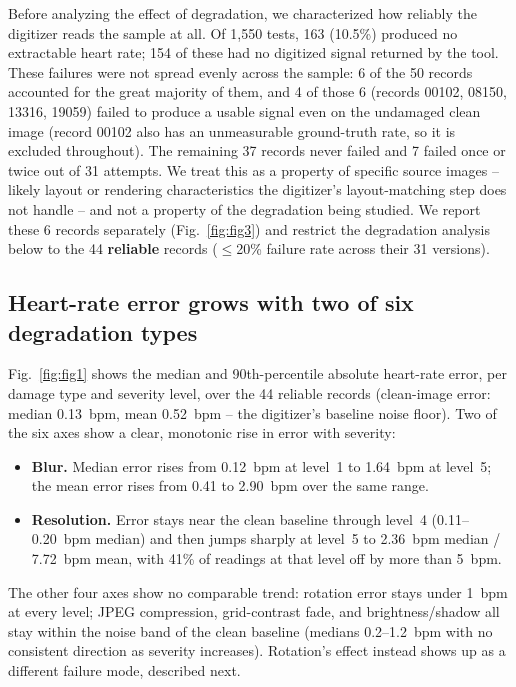 \documentclass[conference]{IEEEtran}
\begin{document}
Before analyzing the effect of degradation, we characterized how reliably the
digitizer reads the sample at all. Of 1{,}550 tests, 163 (10.5\%) produced no
extractable heart rate; 154 of these had no digitized signal returned by the tool.
These failures were not spread evenly across the sample: 6 of the 50 records
accounted for the great majority of them, and 4 of those 6 (records 00102, 08150,
13316, 19059) failed to produce a usable signal even on the undamaged clean image
(record 00102 also has an unmeasurable ground-truth rate, so it is excluded
throughout). The remaining 37 records never failed and 7 failed once or twice out of
31 attempts. We treat this as a property of specific source images -- likely layout
or rendering characteristics the digitizer's layout-matching step does not handle --
and not a property of the degradation being studied. We report these 6 records
separately (Fig.~\ref{fig:fig3}) and restrict the degradation analysis below to the
44 \textbf{reliable} records ($\leq$20\% failure rate across their 31 versions).

\subsection{Heart-rate error grows with two of six degradation types}

Fig.~\ref{fig:fig1} shows the median and 90th-percentile absolute heart-rate error,
per damage type and severity level, over the 44 reliable records (clean-image error:
median 0.13~bpm, mean 0.52~bpm -- the digitizer's baseline noise floor). Two of the
six axes show a clear, monotonic rise in error with severity:

\begin{itemize}
\item \textbf{Blur.} Median error rises from 0.12~bpm at level~1 to 1.64~bpm at
level~5; the mean error rises from 0.41 to 2.90~bpm over the same range.
\item \textbf{Resolution.} Error stays near the clean baseline through level~4
(0.11--0.20~bpm median) and then jumps sharply at level~5 to 2.36~bpm median /
7.72~bpm mean, with 41\% of readings at that level off by more than 5~bpm.
\end{itemize}

The other four axes show no comparable trend: rotation error stays under 1~bpm at
every level; JPEG compression, grid-contrast fade, and brightness/shadow all stay
within the noise band of the clean baseline (medians 0.2--1.2~bpm with no consistent
direction as severity increases). Rotation's effect instead shows up as a different
failure mode, described next.
\end{document}
